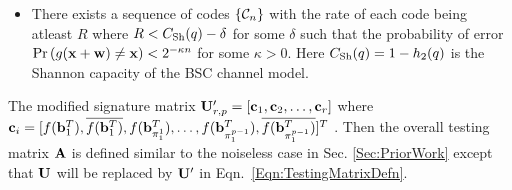 \documentclass[conference,twocolumn]{IEEEtran}
\begin{document}
\begin{itemize}
\item There exists a sequence of codes $\{\mathcal{C}_n\}$ with the rate of each code being atleast $R$ where $R< C_{\text{Sh}}(q)-\delta$ for some $\delta$ such that the probability of error $\text{Pr}\left(g(\mathbf{x+w})\neq \mathbf{x}\right)<2^{-\kappa n}$ for some $\kappa >0$. Here $C_{\text{Sh}}(q)=1-h_2(q)$ is the Shannon capacity of the BSC channel model.
\end{itemize}
The modified signature matrix $\mathbf{U}'_{r,p}=[\mathbf{c}_1,\mathbf{c}_2,\ldots,\mathbf{c}_r]$ where $\mathbf{c}_i=[f(\mathbf{b}^T_1),\overline{f(\mathbf{b}^T_1)},f(\mathbf{b}^T_{\pi^{1}_{1}}),\ldots,f(\mathbf{b}^T_{\pi^{p-1}_{1}}),\overline{f(\mathbf{b}^T_{\pi^{p-1}_{1}})}]^T$ .
Then the overall testing matrix $\mathbf{A}$ is defined similar to the noiseless case in Sec. \ref{Sec:PriorWork} except that $\mathbf{U}$ will be replaced by $\mathbf{U'}$ in Eqn.~\eqref{Eqn:TestingMatrixDefn}.  %
\end{document}
